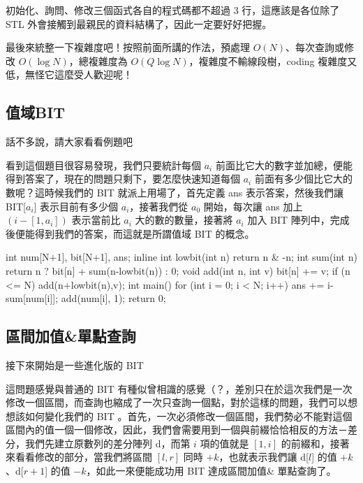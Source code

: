 \par 初始化、詢問、修改三個函式各自的程式碼都不超過 $3$ 行，這應該是各位除了 STL 外會接觸到最親民的資料結構了，因此一定要好好把握。

\par 最後來統整一下複雜度吧！按照前面所講的作法，預處理 $O(N)$、每次查詢或修改 $O(\log{N})$，總複雜度為 $O(Q\log{N})$，複雜度不輸線段樹，coding 複雜度又低，無怪它這麼受人歡迎呢！

\subsection{值域BIT}
話不多說，請大家看看例題吧
\par 看到這個題目很容易發現，我們只要統計每個 $a_i$ 前面比它大的數字並加總，便能得到答案了，現在的問題只剩下，要怎麼快速知道每個 $a_i$ 前面有多少個比它大的數呢？這時候我們的 BIT 就派上用場了，首先定義 ans 表示答案，然後我們讓 BIT[$a_i$] 表示目前有多少個 $a_i$，接著我們從 $a_0$ 開始，每次讓 ans 加上 $(i - [1, a_i])$ 表示當前比 $a_i$ 大的數的數量，接著將 $a_i$ 加入 BIT 陣列中，完成後便能得到我們的答案，而這就是所謂值域 BIT 的概念。
\begin{C++}
int num[N+1], bit[N+1], ans;
inline int lowbit(int n) {return n & -n;}
int sum(int n) {
  return n ? bit[n] + sum(n-lowbit(n)) : 0;
}
void add(int n, int v) {
  bit[n] += v;
  if (n <= N) add(n+lowbit(n),v);
}
int main() {
  for (int i = 0; i < N; i++) {
    ans += i-sum[num[i]];
    add(num[i], 1);
  } 
  return 0;
}
\end{C++}
\subsection{區間加值\&單點查詢}
接下來開始是一些進化版的 BIT
\par 這問題感覺與普通的 BIT 有種似曾相識的感覺（？，差別只在於這次我們是一次修改一個區間，而查詢也縮成了一次只查詢一個點，對於這樣的問題，我們可以想想該如何變化我們的 BIT 。首先，一次必須修改一個區間，我們勢必不能對這個區間內的值一個一個修改，因此，我們會需要用到一個與前綴恰恰相反的方法－差分，我們先建立原數列的差分陣列 d，而第 $i$ 項的值就是 $[1, i]$ 的前綴和，接著來看看修改的部分，當我們將區間 $[l, r]$ 同時 $+k$，也就表示我們讓 d[$l$] 的值 $+k$、d[$r+1$] 的值 $-k$，如此一來便能成功用 BIT 達成區間加值\& 單點查詢了。
